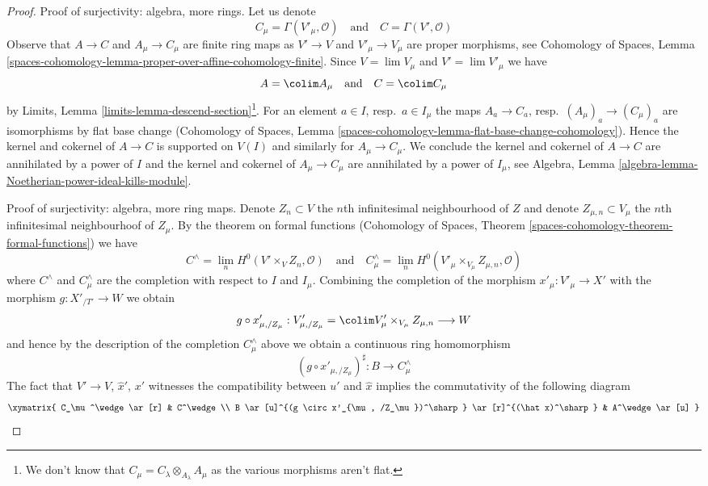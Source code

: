 \begin{proof}
\medskip\noindent
Proof of surjectivity: algebra, more rings.
Let us denote
$$
C_\mu = \Gamma(V'_\mu, \mathcal{O})
\quad\text{and}\quad
C = \Gamma(V', \mathcal{O})
$$
Observe that $A \to C$ and $A_\mu \to C_\mu$ are finite ring maps as
$V' \to V$ and $V'_\mu \to V_\mu$ are proper morphisms, see
Cohomology of Spaces, Lemma
\ref{spaces-cohomology-lemma-proper-over-affine-cohomology-finite}.
Since $V = \lim V_\mu$ and $V' = \lim V'_\mu$
we have
$$
A = \colim A_\mu
\quad\text{and}\quad
C = \colim C_\mu
$$
by Limits, Lemma \ref{limits-lemma-descend-section}\footnote{We don't
know that $C_\mu = C_\lambda \otimes_{A_\lambda} A_\mu$ as the
various morphisms aren't flat.}. For an element
$a \in I$, resp.\ $a \in I_\mu$ the maps $A_a \to C_a$,
resp.\ $(A_\mu)_a \to (C_\mu)_a$ are isomorphisms by flat base change
(Cohomology of Spaces, Lemma
\ref{spaces-cohomology-lemma-flat-base-change-cohomology}).
Hence the kernel and cokernel of $A \to C$ is supported
on $V(I)$ and similarly for $A_\mu \to C_\mu$.
We conclude the kernel and cokernel of $A \to C$
are annihilated by a power of $I$ and the kernel and cokernel of
$A_\mu \to C_\mu$ are annihilated by a power of $I_\mu$, see
Algebra, Lemma \ref{algebra-lemma-Noetherian-power-ideal-kills-module}.

\medskip\noindent
Proof of surjectivity: algebra, more ring maps.
Denote $Z_n \subset V$ the $n$th infinitesimal
neighbourhood of $Z$ and denote $Z_{\mu, n} \subset V_\mu$
the $n$th infinitesimal neighbourhoof of $Z_\mu$.
By the theorem on formal functions
(Cohomology of Spaces, Theorem
\ref{spaces-cohomology-theorem-formal-functions})
we have
$$
C^\wedge = \lim_n H^0(V' \times_V Z_n, \mathcal{O})
\quad\text{and}\quad
C_\mu^\wedge =
\lim_n H^0(V'_\mu \times_{V_\mu} Z_{\mu, n}, \mathcal{O})
$$
where $C^\wedge$ and $C_\mu^\wedge$ are the completion with
respect to $I$ and $I_\mu$.
Combining the completion of the morphism
$x'_\mu : V'_\mu \to X'$ with the morphism $g : X'_{/T'} \to W$ we obtain
$$
g \circ x'_{\mu, /Z_\mu} :
V'_{\mu, /Z_\mu} = \colim V_\mu' \times_{V_\mu} Z_{\mu, n}
\longrightarrow
W
$$
and hence by the description of the completion
$C_\mu^\wedge$ above we obtain a continuous ring homomorphism
$$
(g \circ x'_{\mu, /Z_\mu})^\sharp : B \longrightarrow C_\mu^\wedge
$$
The fact that $V' \to V$, $\hat x'$, $x'$ witnesses the compatibility
between $u'$ and $\hat x$ implies the
commutativity of the following diagram
$$
\xymatrix{
C_\mu^\wedge \ar[r] &
C^\wedge \\
B \ar[u]^{(g \circ x'_{\mu, /Z_\mu})^\sharp} \ar[r]^{(\hat x)^\sharp} &
A^\wedge \ar[u]
}
$$


\end{proof}

